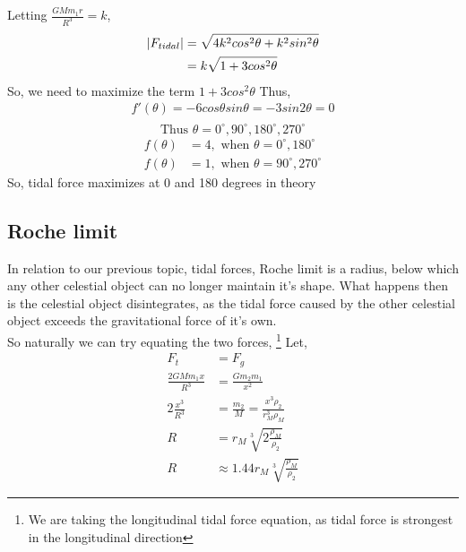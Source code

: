 \documentclass[10pt, a4paper]{article}
\begin{document}
\begin{tcolorbox}[colback=blue!5!white,colframe=blue!75!black,title=Solution]
Letting $\frac{GMm_1r}{R^3}=k$,
\begin{align*}
    \abs{F_{tidal}} &=\sqrt{4k^2cos^2\theta+k^2sin^2\theta} \\
        &= k\sqrt{1+3cos^2\theta}
\end{align*}
    So, we need to maximize the term $1+3cos^2\theta$
    Thus,
\begin{align*}
    f'(\theta) = -6cos\theta sin\theta = -3sin2\theta = 0 \\
\end{align*}
\begin{equation*}
    \text{Thus } \theta=0^\circ, 90^\circ,180^\circ, 270^\circ
\end{equation*}
\begin{align*}
    f(\theta) &= 4 , \text{ when } \theta=0^\circ, 180^\circ \\
    f(\theta) &= 1 , \text{ when } \theta=90^\circ, 270^\circ
\end{align*}
So, tidal force maximizes at 0 and 180 degrees in theory
\end{tcolorbox}
\newpage
\subsection{Roche limit}
In relation to our previous topic, tidal forces, Roche limit is a radius, below which any other celestial object can no longer maintain it's shape. What happens then is the celestial object disintegrates, as the tidal force caused by the other celestial object exceeds the gravitational force of it's own. 
\\
So naturally we can try equating the two forces, \footnote{We are taking the longitudinal tidal force equation, as tidal force is strongest in the longitudinal direction}
Let,
\begin{align*}
    F_t &= F_g \\
    \frac{2GMm_1x}{R^3} &= \frac{Gm_2m_1}{x^2} \\
    2\frac{x^3}{R^3} &= \frac{m_2}{M} = \frac{x^3 \rho_2}{r_M^3 \rho_M} \\
    R &= r_M \sqrt[3]{2\frac{\rho_M}{\rho_2}} \\
    R &\approx 1.44 r_M \sqrt[3]{\frac{\rho_M}{\rho_2}} 
\end{align*}
\end{document}
